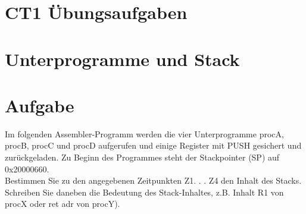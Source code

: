 \section*{CT1 Übungsaufgaben}
\section*{Unterprogramme und Stack}
\section*{Aufgabe}
Im folgenden Assembler-Programm werden die vier Unterprogramme procA, procB, procC und procD aufgerufen und einige Register mit PUSH gesichert und zurückgeladen. Zu Beginn des Programmes steht der Stackpointer (SP) auf 0x20000660.\\
Bestimmen Sie zu den angegebenen Zeitpunkten Z1. . . Z4 den Inhalt des Stacks. Schreiben Sie daneben die Bedeutung des Stack-Inhaltes, z.B. Inhalt R1 von procX oder ret adr von procY).

